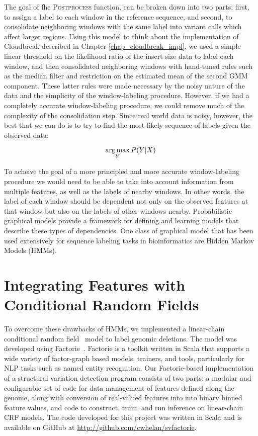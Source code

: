 The goal of fhe \textsc{Postprocess} function, can be broken down into two parts: first, to assign a label to each window in the reference sequence, and second, to consolidate neighboring windows with the same label into variant calls which affect larger regions. Using this model to think about the implementation of Cloudbreak described in Chapter \ref{chap_cloudbreak_impl}, we used a simple linear threshold on the likelihood ratio of the insert size data to label each window, and then consolidated neighboring windows with hand-tuned rules such as the median filter and restriction on the estimated mean of the second GMM component. These latter rules were made necessary by the noisy nature of the data and the simplicity of the window-labeling procedure. However, if we had a completely accurate window-labeling procedure, we could remove much of the complexity of the consolidation step. Since real world data is noisy, however, the best that we can do is to try to find the most likely sequence of labels given the observed data:

\[ \operatorname*{arg\,max}_Y P(Y|X) \]

To acheive the goal of a more principled and more accurate window-labeling procedure we would need to be able to take into account information from multiple features, as well as the labels of nearby windows. In other words, the label of each window should be dependent not only on the observed features at that window but also on the labels of other windows nearby. Probabilistic graphical models provide a framework for defining and learning models that describe these types of dependencies.  One class of graphical model that has been used extensively for sequence labeling tasks in bioinformatics are Hidden Markov Models (HMMs). 

\section{Integrating Features with Conditional Random Fields}

To overcome these drawbacks of HMMs, we implemented a linear-chain conditional random field~\cite{Lafferty:2001:CRF:645530.655813} model to label genomic deletions. The model was developed using Factorie~\cite{mccallum09:factorie}. Factorie is a toolkit written in Scala that supports a wide variety of factor-graph based models, trainers, and tools, particularly for NLP tasks such as named entity recognition. Our Factorie-based implementation of a structural variation detection program consists of two parts: a modular and configurable set of code for data management of features defined along the genome, along with conversion of real-valued features into into binary binned feature values, and code to construct, train, and run inference on linear-chain CRF models. The code developed for this project was written in Scala and is available on GitHub at \url{http://github.com/cwhelan/svfactorie}. 

